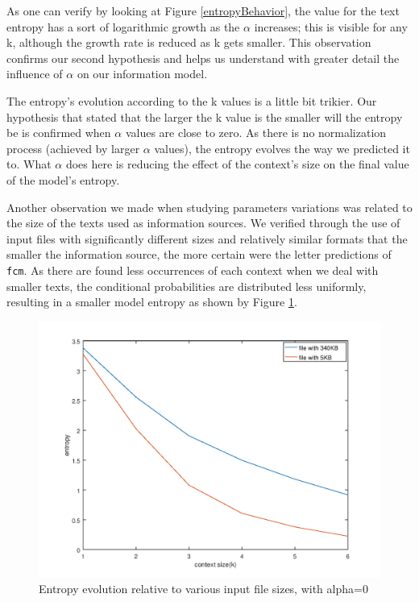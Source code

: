 \documentclass[12pt]{article}
\begin{document}
As one can verify by looking at Figure \ref{entropyBehavior}, the value for the text
entropy has a sort of logarithmic growth as the $\alpha$ increases; this is 
visible for any k, although the growth rate is reduced as k gets smaller.
This observation confirms our second hypothesis and helps us understand with
greater detail the influence of $\alpha$ on our information model.

The entropy's evolution according to the k values is a little bit trikier.
Our hypothesis that stated that the larger the k value is the smaller will
the entropy be is confirmed when $\alpha$ values are close to zero.
As there is no normalization process (achieved by larger $\alpha$ values),
the entropy evolves the way we predicted it to.
What $\alpha$ does here is reducing the effect of the context's size on the 
final value of the model's entropy.

Another observation we made when studying parameters variations was related
to the size of the texts used as information sources.
We verified through the use of input files with significantly different sizes
and relatively similar formats that the smaller the information source, the
more certain were the letter predictions of \texttt{fcm}.
As there are found less occurrences of each context when we deal with smaller
texts, the conditional probabilities are distributed less uniformly, resulting
in a smaller model entropy as shown by Figure \ref{sizeComparison}.

\begin{figure}[h!]
  \includegraphics[width=\linewidth]{sizeComparison.png}
  \caption{Entropy evolution relative to various input file sizes, with alpha=0}
  \label{sizeComparison}
\end{figure}
\end{document}
